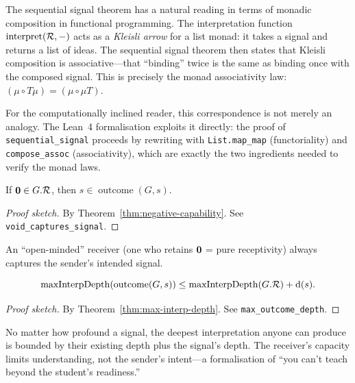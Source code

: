 \begin{remark}
\label{rem:monadic}
The sequential signal theorem has a natural reading in terms of monadic
composition in functional programming.  The interpretation function
$\operatorname{interpret}(\mathcal{R}, -)$ acts as a \emph{Kleisli arrow} for
a list monad: it takes a signal and returns a list of ideas.  The
sequential signal theorem then states that Kleisli composition is
associative---that ``binding'' twice is the same as binding once with
the composed signal.  This is precisely the monad associativity law:
$(\mu \circ T\mu) = (\mu \circ \mu T)$.

For the computationally inclined reader, this correspondence is not
merely an analogy.  The Lean~4 formalisation exploits it directly:
the proof of \texttt{sequential\_signal} proceeds by rewriting with
\texttt{List.map\_map} (functoriality) and \texttt{compose\_assoc}
(associativity), which are exactly the two ingredients needed to
verify the monad laws.
\end{remark}

\begin{theorem}
\label{thm:void-captures}
If $\mathbf{0} \in G.\mathcal{R}$, then $s \in \operatorname{outcome}(G, s)$.
\end{theorem}

\begin{proof}[Proof sketch]
By Theorem~\ref{thm:negative-capability}.
See \texttt{void\_captures\_signal}.
\end{proof}

\begin{remark}
An ``open-minded'' receiver (one who retains $\mathbf{0}$ = pure receptivity)
always captures the sender's intended signal.
\end{remark}

\begin{theorem}
\label{thm:max-outcome-depth}
\[
  \operatorname{maxInterpDepth}(\operatorname{outcome}(G, s))
  \leq \operatorname{maxInterpDepth}(G.\mathcal{R}) + \operatorname{d}(s).
\]
\end{theorem}

\begin{proof}[Proof sketch]
By Theorem~\ref{thm:max-interp-depth}.
See \texttt{max\_outcome\_depth}.
\end{proof}

\begin{remark}
No matter how profound a signal, the deepest interpretation anyone can
produce is bounded by their existing depth plus the signal's depth.  The
receiver's capacity limits understanding, not the sender's intent---a
formalisation of ``you can't teach beyond the student's readiness.''
\end{remark}

